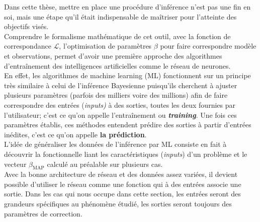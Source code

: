 \documentclass[a4paper,12pt]{article}
\newcommand{\bmap}{\beta_{\text{MAP}}}
\numberwithin{equation}{section} %
\begin{document}
\noindent Dans cette thèse, mettre en place une procédure d'inférence n'est pas une fin en soi, mais une étape qu'il était indispensable de maîtriser pour l'atteinte des objectifs visés.\\
Comprendre le formalisme mathématique de cet outil, avec la fonction de correspondance $\mathcal{L}$, l'optimisation de paramètres $\beta$ pour faire correspondre modèle et observations, permet d'avoir une première approche des algorithmes d'entraînement des intelligences artificielles comme le réseau de neurones.\\
En effet, les algorithmes de machine learning (ML) fonctionnent sur un principe très similaire à celui de l'inférence Bayesienne puisqu'ils cherchent à ajuster plusieurs paramètres (parfois des milliers voire des millions) afin de faire correspondre des entrées (\textit{inputs)} à des sorties, toutes les deux fournies par l'utilisateur; c'est ce qu'on appelle l'entraînement ou \textbf{\textit{training}}. Une fois ces paramètres établis, ces méthodes entendent prédire des sorties à partir d'entrées inédites, c'est ce qu'on appelle \textbf{la prédiction}.\\

\noindent L'idée de généraliser les données de l'inférence par ML consiste en fait à découvrir la fonctionnelle liant les caractéristiques (\textit{inputs}) d'un problème et le vecteur $\bmap$ calculé au préalable sur plusieurs cas.\\
Avec la bonne architecture de réseau et des données assez variées, il devient possible d'utiliser le réseau comme une fonction qui à des entrées associe une sortie. Dans les cas qui nous occupe dans cette section, les entrées seront des grandeurs spécifiques au phénomène étudié, les sorties seront toujours des paramètres de correction.
\end{document}
